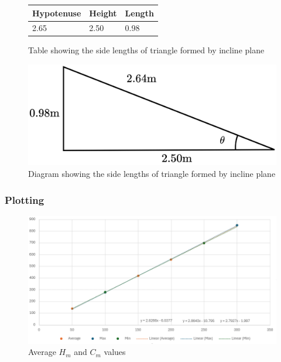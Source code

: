 \documentclass[11pt,a4paper]{article}
\begin{document}
\begin{figure}[H]
	\centering

	\begin{tabular}{|l|l|l|}
		\hline
		\textbf{Hypotenuse} & \textbf{Height} & \textbf{Length} \\ \hline
		2.65       & 2.50   & 0.98   \\ \hline
	\end{tabular}

	\caption{Table showing the side lengths of triangle formed by incline plane}
\end{figure}


\begin{figure}[H]
	\centering
	\includegraphics[width=0.35\paperwidth]{./Diagrams/LengthDiagram.png}
	\caption{Diagram showing the side lengths of triangle formed by incline plane}
\end{figure}


\subsubsection{Plotting}

\begin{figure}[H]
\centering
\includegraphics[width=0.8\paperwidth]{newresults.png}
\caption{Average $H_m$ and $C_m$ values}
\end{figure}
\end{document}
